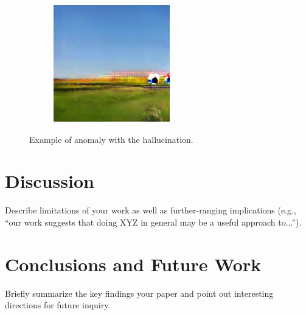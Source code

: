 \documentclass{article}
\begin{document}
\begin{figure}
	\captionsetup[subfigure]{labelformat=empty}
    \centering
    \begin{subfigure}[b]{\textwidth}
        \includegraphics[width=\textwidth]{figs/fig5/fig5}
    \end{subfigure}
  	\caption{Example of anomaly with the hallucination.}
  	\label{fig:fig5}
\end{figure}

\section{Discussion}
Describe limitations of your work as well as further-ranging implications (e.g., ``our work suggests that doing XYZ in general may be a useful approach to...'').

\section{Conclusions and Future Work}
Briefly summarize the key findings your paper and point out interesting directions for future inquiry.



\end{document}
